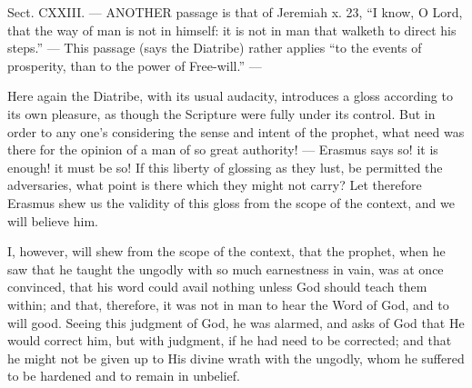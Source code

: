 
Sect. CXXIII. — ANOTHER passage is that of Jeremiah x. 23, “I know, O Lord, that the way of man is not in himself: it is not in man that walketh to direct his steps.” — This passage (says the Diatribe) rather applies “to the events of prosperity, than to the power of Free-will.” —

Here again the Diatribe, with its usual audacity, introduces a gloss according to its own pleasure, as though the Scripture were fully under its control. But in order to any one’s considering the sense and intent of the prophet, what need was there for the opinion of a man of so great authority! — Erasmus says so! it is enough! it must be so! If this liberty of glossing as they lust, be permitted the adversaries, what point is there which they might not carry? Let therefore Erasmus shew us the validity of this gloss from the scope of the context, and we will believe him.

I, however, will shew from the scope of the context, that the prophet, when he saw that he taught the ungodly with so much earnestness in vain, was at once convinced, that his word could avail nothing unless God should teach them within; and that, therefore, it was not in man to hear the Word of God, and to will good. Seeing this judgment of God, he was alarmed, and asks of God that He would correct him, but with judgment, if he had need to be corrected; and that he might not be given up to His divine wrath with the ungodly, whom he suffered to be hardened and to remain in unbelief.

